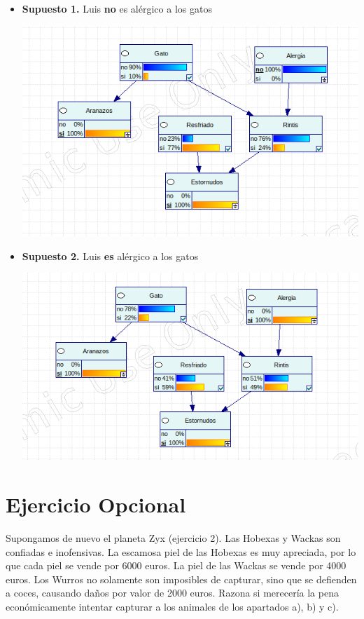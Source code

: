\documentclass{article}
\begin{document}
\begin{itemize}[label={}]
  \item \textbf{Supuesto 1.} Luis \textbf{no} es alérgico a los gatos
 	\begin{center}
	\includegraphics[scale=0.5]{3a.png}
	\end{center}
  \item \textbf{Supuesto 2.} Luis \textbf{es} alérgico a los gatos
	\begin{center}
	\includegraphics[scale=0.5]{3b.png}
	\end{center}
\end{itemize}

\section{\textbf{Ejercicio Opcional}}

Supongamos de nuevo el planeta Zyx (ejercicio 2). Las Hobexas y Wackas son confiadas e
inofensivas. La escamosa piel de las Hobexas es muy apreciada, por lo que cada piel se vende por 6000 euros. La piel de las Wackas se vende por 4000 euros. Los Wurros no solamente son
imposibles de capturar, sino que se defienden a coces, causando daños por valor de 2000 euros. Razona si merecería la pena económicamente intentar capturar a los animales de los apartados a), b) y c).
\end{document}
